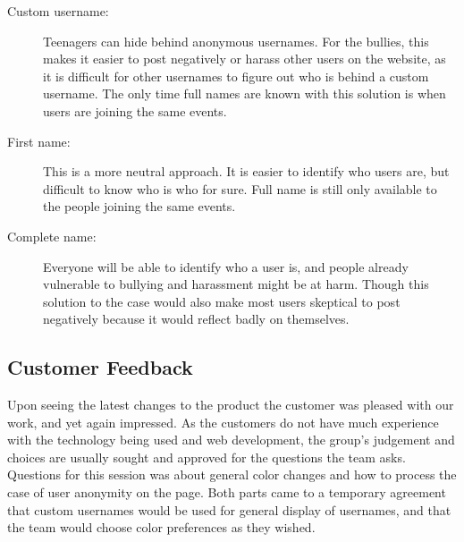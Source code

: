 \begin{description}
\item[Custom username: ] Teenagers can hide behind anonymous usernames. For the bullies, this makes it easier to post negatively or harass other users on the website, as it is difficult for other usernames to figure out who is behind a custom username. The only time full names are known with this solution is when users are joining the same events. 
\item[First name: ] This is a more neutral approach. It is easier to identify who users are, but difficult to know who is who for sure. Full name is still only available to the people joining the same events.
\item[Complete name: ] Everyone will be able to identify who a user is, and people already vulnerable to bullying and harassment might be at harm. Though this solution to the case would also make most users skeptical to post negatively because it would reflect badly on themselves. 
\end{description}


\subsection{Customer Feedback}
\label{subsec:S2RetrospectiveFeedback}
Upon seeing the latest changes to the product the customer was pleased with our work, and yet again impressed. As the customers do not have much experience with the technology being used and web development, the group's judgement and choices are usually sought and approved for the questions the team asks. Questions for this session was about general color changes and how to process the case of user anonymity on the page. Both parts came to a temporary agreement that custom usernames would be used for general display of usernames, and that the team would choose color preferences as they wished.
